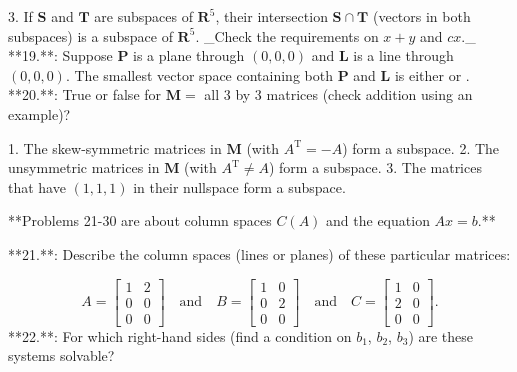 3. If \(\mathbf{S}\) and \(\mathbf{T}\) are subspaces of \(\mathbf{R}^{5}\), their intersection \(\mathbf{S}\cap\mathbf{T}\) (vectors in both subspaces) is a subspace of \(\mathbf{R}^{5}\). _Check the requirements on \(x+y\) and \(cx\)._
**19.**: Suppose \(\mathbf{P}\) is a plane through \((0,0,0)\) and \(\mathbf{L}\) is a line through \((0,0,0)\). The smallest vector space containing both \(\mathbf{P}\) and \(\mathbf{L}\) is either or .
**20.**: True or false for \(\mathbf{M}=\) all 3 by 3 matrices (check addition using an example)?

1. The skew-symmetric matrices in \(\mathbf{M}\) (with \(A^{\mathrm{T}}=-A\)) form a subspace.
2. The unsymmetric matrices in \(\mathbf{M}\) (with \(A^{\mathrm{T}}\neq A\)) form a subspace.
3. The matrices that have \((1,1,1)\) in their nullspace form a subspace.

**Problems 21-30 are about column spaces \(C(A)\) and the equation \(Ax=b\).**

**21.**: Describe the column spaces (lines or planes) of these particular matrices:

\[A=\begin{bmatrix}1&2\\ 0&0\\ 0&0\end{bmatrix}\quad\text{and}\quad B=\begin{bmatrix}1&0\\ 0&2\\ 0&0\end{bmatrix}\quad\text{and}\quad C=\begin{bmatrix}1&0\\ 2&0\\ 0&0\end{bmatrix}.\]
**22.**: For which right-hand sides (find a condition on \(b_{1}\), \(b_{2}\), \(b_{3}\)) are these systems solvable?

